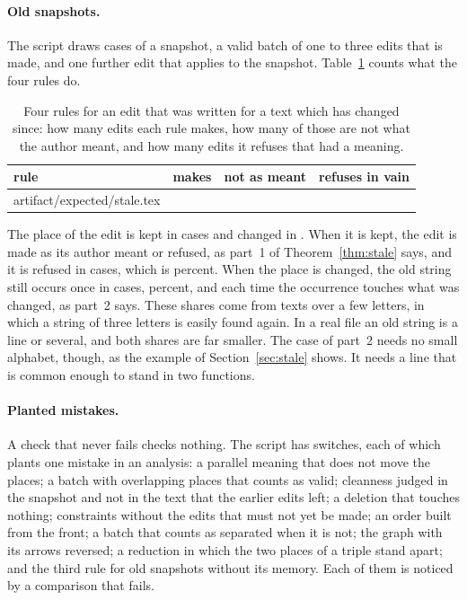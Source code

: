 \documentclass[acmsmall,nonacm,screen]{acmart}
\makeatletter
\newcommand{\claim}[2]{#2}
\newcommand{\rows}[1]{\@@input artifact/expected/#1.tex }
\makeatother
\begin{document}
\paragraph{Old snapshots.} The script draws \exStaleTrials{} cases of a snapshot, a valid
batch of one to three edits that is made, and one further edit that applies to the snapshot.
Table~\ref{tab:stale} counts what the four rules do.

\begin{table}
\caption{Four rules for an edit that was written for a text which has changed since: how
many edits each rule makes, how many of those are not what the author meant, and how many
edits it refuses that had a meaning.}\label{tab:stale}
\begin{tabular}{lrrr}
\toprule
rule & makes & not as meant & refuses in vain \\
\midrule
\rows{stale}
\bottomrule
\end{tabular}
\end{table}

\claim{stale}{The place of the edit is kept in \exStaleKept{} cases and changed in
\exStaleChanged{}. When it is kept, the edit is made as its author meant or refused, as
part~1 of Theorem~\ref{thm:stale} says, and it is refused in \exStaleRefused{} cases, which
is \exStaleRefusedShare{} percent. When the place is changed, the old string still occurs
once in \exStaleWrong{} cases, \exStaleWrongShare{} percent, and each time the occurrence
touches what was changed, as part~2 says.} These shares come from texts over a few letters,
in which a string of three letters is easily found again. In a real file an old string is a
line or several, and both shares are far smaller. The case of part~2 needs no small alphabet,
though, as the example of Section~\ref{sec:stale} shows. It needs a line that is common
enough to stand in two functions.

\paragraph{Planted mistakes.} A check that never fails checks nothing. The script has
\exMutants{} switches, each of which plants one mistake in an analysis: a parallel meaning
that does not move the places; a batch with overlapping places that counts as valid;
cleanness judged in the snapshot and not in the text that the earlier edits left; a deletion
that touches nothing; constraints without the edits that must not yet be made; an order built
from the front; a batch that counts as separated when it is not; the graph with its arrows
reversed; a reduction in which the two places of a triple stand apart; and the third rule for
old snapshots without its memory. \claim{all-noticed}{Each
of them is noticed by a comparison that fails.}
\end{document}
